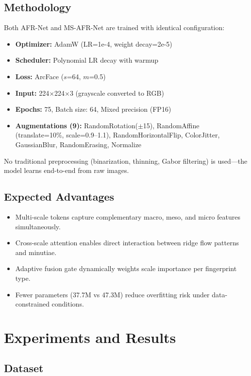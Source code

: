 \documentclass[conference]{IEEEtran}
\begin{document}
\subsection{Methodology}

Both AFR-Net and MS-AFR-Net are trained with identical configuration:
\begin{itemize}
    \item \textbf{Optimizer:} AdamW (LR=1e-4, weight decay=2e-5)
    \item \textbf{Scheduler:} Polynomial LR decay with warmup
    \item \textbf{Loss:} ArcFace ($s$=64, $m$=0.5)
    \item \textbf{Input:} 224$\times$224$\times$3 (grayscale converted to RGB)
    \item \textbf{Epochs:} 75, Batch size: 64, Mixed precision (FP16)
    \item \textbf{Augmentations (9):} RandomRotation($\pm$15\textdegree), RandomAffine (translate=10\%, scale=0.9--1.1), RandomHorizontalFlip, ColorJitter, GaussianBlur, RandomErasing, Normalize
\end{itemize}

No traditional preprocessing (binarization, thinning, Gabor filtering) is used---the model learns end-to-end from raw images.

\subsection{Expected Advantages}
\begin{itemize}
    \item Multi-scale tokens capture complementary macro, meso, and micro features simultaneously.
    \item Cross-scale attention enables direct interaction between ridge flow patterns and minutiae.
    \item Adaptive fusion gate dynamically weights scale importance per fingerprint type.
    \item Fewer parameters (37.7M vs 47.3M) reduce overfitting risk under data-constrained conditions.
\end{itemize}

\section{Experiments and Results}

\subsection{Dataset}
\end{document}
